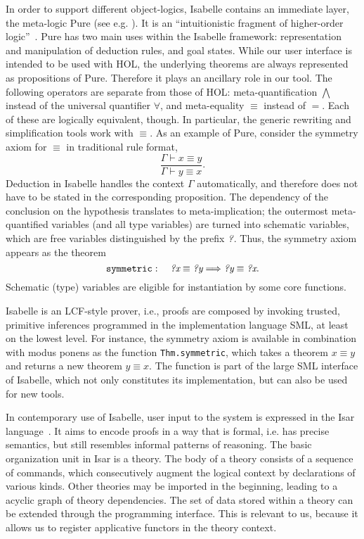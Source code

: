 In order to support different object-logics, Isabelle contains an immediate
layer, the meta-logic Pure (see e.g. \cite[Chapter~2]{implementation-ref}).
It is an ``intuitionistic fragment of higher-order logic''~\cite[27]{isar-ref}.
Pure has two main uses within the Isabelle framework: representation and
manipulation of deduction rules, and goal states.
While our user interface is intended to be used with HOL, the underlying
theorems are always represented as propositions of Pure.
Therefore it plays an ancillary role in our tool.
The following operators are separate from those of HOL:
meta-quantification $\bigwedge$ instead of the universal quantifier $\forall$,
and meta-equality $\equiv$ instead of $=$.
Each of these are logically equivalent, though.
In particular, the generic rewriting and simplification tools work with $\equiv$.
As an example of Pure, consider the symmetry axiom for $\equiv$ in traditional
rule format,
\[ \frac{\Gamma \vdash x \equiv y}{\Gamma \vdash y \equiv x}. \]
Deduction in Isabelle handles the context $\Gamma$ automatically, and
therefore does not have to be stated in the corresponding proposition.
The dependency of the conclusion on the hypothesis translates to
meta-implication;
the outermost meta-quantified variables (and all type variables) %
are turned into schematic variables, which are free variables distinguished by
the prefix $\textit{?}$.
Thus, the symmetry axiom appears as the theorem
\[ \mathtt{symmetric}:\quad \textit{?x} \equiv \textit{?y} \Longrightarrow \textit{?y} \equiv \textit{?x}. \]
Schematic (type) variables are eligible for instantiation by some core
functions. %

Isabelle is an LCF-style prover, i.e., proofs are composed by invoking
trusted, primitive inferences programmed in the implementation language
SML, at least on the lowest level.
For instance, the symmetry axiom is available in combination with modus ponens
as the function \verb|Thm.symmetric|, which takes a theorem $x \equiv y$ and
returns a new theorem $y \equiv x$.
The function is part of the large SML interface of Isabelle, which not only
constitutes its implementation, but can also be used for new tools.

In contemporary use of Isabelle, user input to the system is expressed in
the Isar language~\cite{wenzel99,wenzel02,isar-ref}.
It aims to encode proofs in a way that is formal, i.e. has precise semantics,
but still resembles informal patterns of reasoning.
The basic organization unit in Isar is a theory.
The body of a theory consists of a sequence of commands, which consecutively
augment the logical context by declarations of various kinds.
Other theories may be imported in the beginning, leading to a acyclic graph
of theory dependencies.
The set of data stored within a theory can be extended through the programming
interface.
This is relevant to us, because it allows us to register applicative
functors in the theory context.

